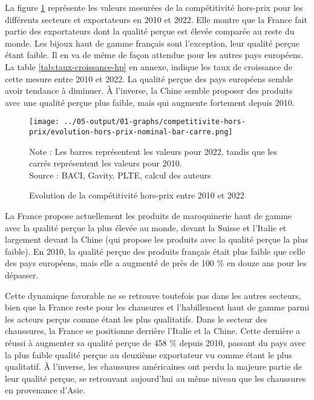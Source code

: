 \documentclass[french,10pt,a4paper]{article}
\begin{document}
La figure \ref{fig:hors-prix} représente les valeurs mesurées de la compétitivité hors-prix pour les différents secteurs et exportateurs en 2010 et 2022. Elle montre que la France fait partie des exportateurs dont la qualité perçue est élevée comparée au reste du monde. Les bijoux haut de gamme français sont l'exception, leur qualité perçue étant faible. Il en va de même de façon attendue pour les autres pays européens. La table \ref{tab:taux-croissance-hp} en annexe, indique les taux de croissance de cette mesure entre 2010 et 2022. La qualité perçue des pays européens semble avoir tendance à diminuer. À l'inverse, la Chine semble proposer des produits avec une qualité perçue plus faible, mais qui augmente fortement depuis 2010.

\begin{figure}[!h]
  \centering
  \texttt{[image: ../05-output/01-graphs/competitivite-hors-prix/evolution-hors-prix-nominal-bar-carre.png]}
  \captionsetup{justification=justified, singlelinecheck=false, font=small}
  \caption*{Note : Les barres représentent les valeurs pour 2022, tandis que les carrés représentent les valeurs pour 2010. \\
  Source : BACI, Gavity, PLTE, calcul des auteurs}
  \captionsetup{justification=centering, singlelinecheck=true, font=normalsize}
  \caption{Evolution de la compétitivité hors-prix entre 2010 et 2022}
  \label{fig:hors-prix}
\end{figure}

\bigskip

La France propose actuellement les produits de maroquinerie haut de gamme avec la qualité perçue la plus élevée au monde, devant la Suisse et l'Italie et largement devant la Chine (qui propose les produits avec la qualité perçue la plus faible). En 2010, la qualité perçue des produits français était plus faible que celle des pays européens, mais elle a augmenté de près de 100 \% en douze ans pour les dépasser.

Cette dynamique favorable ne se retrouve toutefois pas dans les autres secteurs, bien que la France reste pour les chausures et l'habillement haut de gamme parmi les acteurs perçus comme étant les plus qualitatifs. Dans le secteur des chaussures, la France se positionne derrière l'Italie et la Chine. Cette dernière a réussi à augmenter sa qualité perçue de 458 \% depuis 2010, passant du pays avec la plus faible qualité perçue au deuxième exportateur vu comme étant le plus qualitatif. À l'inverse, les chaussures américaines ont perdu la majeure partie de leur qualité perçue, se retrouvant aujourd'hui au même niveau que les chaussures en provenance d'Asie.
\end{document}
